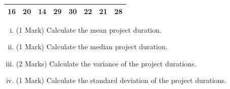 \documentclass[a4paper,12pt]{article}
\begin{document}
\begin{table}[ht]
	\centering
	\begin{tabular}{|rrrrrrrr|}
		\hline
		
		16 &  20 &  14 &  29 &  30 &  22 &  21 &  28 \\ 
		\hline
	\end{tabular}
\end{table}	
\vspace{-0.5cm}


\begin{enumerate}[(i)]
	\item (1 Mark) Calculate the mean project duration.
	\item (1 Mark) Calculate the median project duration.
	\item (2 Marks) Calculate the variance of the project durations.
	\item (1 Mark) Calculate the standard deviation of the project durations.
\end{enumerate}


%		
%		
\end{document}
